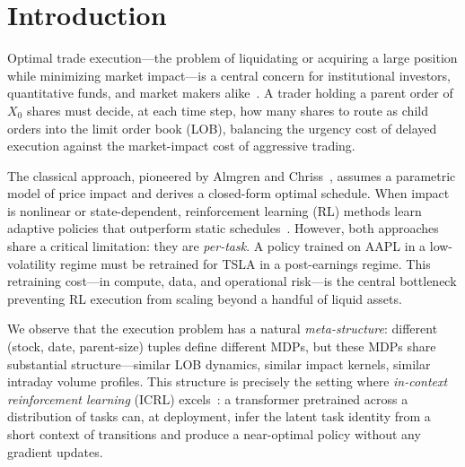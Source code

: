 \documentclass[sigconf,review,anonymous]{acmart}
\begin{document}


\maketitle

\section{Introduction}\label{sec:intro}

Optimal trade execution---the problem of liquidating or acquiring a large position while minimizing market impact---is a central concern for institutional investors, quantitative funds, and market makers alike~\cite{almgren2001optimal, cartea2015algorithmic}.
A trader holding a parent order of $X_0$ shares must decide, at each time step, how many shares to route as child orders into the limit order book (LOB), balancing the urgency cost of delayed execution against the market-impact cost of aggressive trading.

The classical approach, pioneered by Almgren and Chriss~\cite{almgren2001optimal}, assumes a parametric model of price impact and derives a closed-form optimal schedule.
When impact is nonlinear or state-dependent, reinforcement learning (RL) methods learn adaptive policies that outperform static schedules~\cite{nevmyvaka2006reinforcement, hendricks2014reinforcement, karpe2020multi}.
However, both approaches share a critical limitation: they are \emph{per-task}.
A policy trained on AAPL in a low-volatility regime must be retrained for TSLA in a post-earnings regime.
This retraining cost---in compute, data, and operational risk---is the central bottleneck preventing RL execution from scaling beyond a handful of liquid assets.

We observe that the execution problem has a natural \emph{meta-structure}: different (stock, date, parent-size) tuples define different MDPs, but these MDPs share substantial structure---similar LOB dynamics, similar impact kernels, similar intraday volume profiles.
This structure is precisely the setting where \emph{in-context reinforcement learning} (ICRL) excels~\cite{lee2023supervised}: a transformer pretrained across a distribution of tasks can, at deployment, infer the latent task identity from a short context of transitions and produce a near-optimal policy without any gradient updates.
\end{document}
